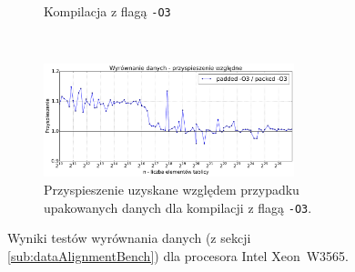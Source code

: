 \begin{figure}[!h]
\begin{subfigure}[c]{0.45\textwidth}
        \caption{Kompilacja z flagą \texttt{-O3}}
    \end{subfigure}
    \\
    \vspace{0.55cm}
    \begin{subfigure}[c]{1.0\textwidth}
        \centering
        \includegraphics[width=0.80\textwidth]{images/benchs_xeon/data_alignment_normalized}
        \caption{Przyspieszenie uzyskane względem przypadku upakowanych danych dla kompilacji z flagą \texttt{-O3}.}
        \label{fig:dataAlignmentRelativeXeon} 
    \end{subfigure}
    \caption{Wyniki testów wyrównania danych (z sekcji \ref{sub:dataAlignmentBench}) dla procesora Intel \mbox{Xeon W3565}.}
    \label{fig:dataAlignmentBenchXeon}
\end{figure}

